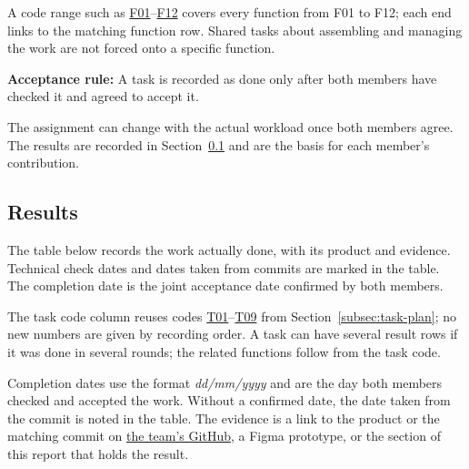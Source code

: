 A code range such as \hyperlink{F01}{F01}--\hyperlink{F12}{F12} covers every
function from F01 to F12; each end links to the matching function row.
Shared tasks about assembling and managing the work are not forced onto a
specific function.

\noindent\textbf{Acceptance rule:}
A task is recorded as done only after both members have checked it and
agreed to accept it.

The assignment can change with the actual workload once both members agree.
The results are recorded in Section~\ref{subsec:task-results} and are the basis
for each member's contribution.

\clearpage
\subsection{Results}
\label{subsec:task-results}

The table below records the work actually done, with its product and evidence.
Technical check dates and dates taken from commits are marked in the table.
The completion date is the joint acceptance date confirmed by both members.

The task code column reuses codes \hyperlink{T01}{T01}--\hyperlink{T09}{T09}
from Section~\ref{subsec:task-plan}; no new numbers are given by recording order.
A task can have several result rows if it was done in several rounds; the related
functions follow from the task code.

Completion dates use the format \textit{dd/mm/yyyy} and are the day both members
checked and accepted the work. Without a confirmed date, the date taken from the
commit is noted in the table. The evidence is a link to the product or the
matching commit on
\href{https://github.com/nguyenshai/Project-java}{the team's GitHub}, a Figma
prototype, or the section of this report that holds the result.

